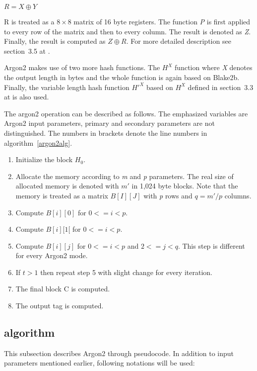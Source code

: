 \documentclass[nolof]{fithesis3}
\begin{document}
\(R = X \oplus Y \)

R is treated as a \(8 \times 8 \) matrix of 16 byte registers. The function \emph{P} is first applied to every row of the matrix and then to every column. The result is denoted as \emph{Z}. Finally, the result is computed as \(Z \oplus R\). For more detailed description see section~3.5 at \parencite{argon2draft}.

Argon2 makes use of two more hash functions. The \emph{\(H^X\)} function where \emph{X} denotes the output length in bytes and the whole function is again based on Blake2b. Finally, the variable length hash function \emph{\(H'^X\)} based on \emph{\(H^X\)} defined in section~3.3 at \parencite{argon2draft} is also used.

The argon2 operation can be described as follows. The emphasized variables are Argon2 input parameters, primary and secondary parameters are not distinguished. The numbers in brackets denote the line numbers in algorithm~\ref{argon2alg}.

\begin{enumerate}
\item Initialize the block \(H_0\).

\item Allocate the memory according to \emph{m} and \emph{p} parameters. The real size of allocated memory is denoted with \(m'\) in 1,024 byte blocks. Note that the memory is treated as a matrix \(B[I][J]\) with \emph{p} rows and \(q = m' / p\) columns.

\item Compute \(B[i][0]\) for \(0 <= i < p\).

\item Compute \(B[i][1[\) for \(0 <= i < p\).

\item Compute \(B[i][j]\) for \(0 <= i < p\) and \(2 <= j < q\). This step is different for every Argon2 mode.

\item If \emph{\(t\)}\(> 1\) then repeat step 5 with slight change for every iteration.

\item The final block C is computed.

\item The output tag is computed.
\end{enumerate}

\subsection{algorithm}
This subsection describes Argon2 through pseudocode. In addition to input parameters mentioned earlier, following notations will be used:
\end{document}
